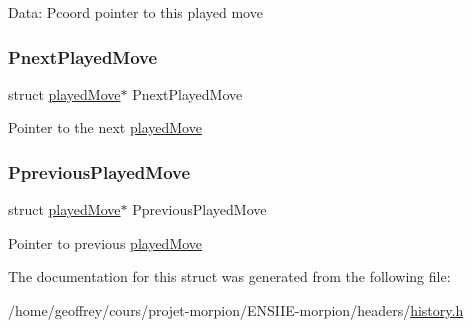 Data\+: Pcoord pointer to this played move \mbox{\label{structplayed_move_a3d7384aebd5f0ff66a5ab19773ea1136}} 
\subsubsection{\texorpdfstring{Pnext\+Played\+Move}{PnextPlayedMove}}
{\footnotesize\ttfamily struct \hyperlink{structplayed_move}{played\+Move}$\ast$ Pnext\+Played\+Move}

Pointer to the next \hyperlink{structplayed_move}{played\+Move} \mbox{\label{structplayed_move_ae1f0ee9fe8e8a08023879b9656a55f62}} 
\subsubsection{\texorpdfstring{Pprevious\+Played\+Move}{PpreviousPlayedMove}}
{\footnotesize\ttfamily struct \hyperlink{structplayed_move}{played\+Move}$\ast$ Pprevious\+Played\+Move}

Pointer to previous \hyperlink{structplayed_move}{played\+Move} 

The documentation for this struct was generated from the following file\+:\begin{DoxyCompactItemize}
\item 
/home/geoffrey/cours/projet-\/morpion/\+E\+N\+S\+I\+I\+E-\/morpion/headers/\hyperlink{history_8h}{history.\+h}\end{DoxyCompactItemize}
